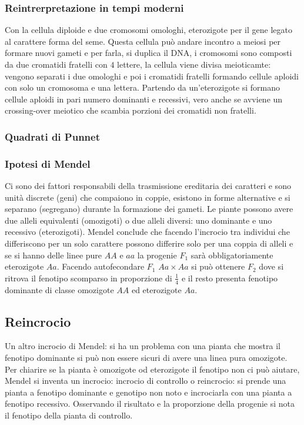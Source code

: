 \subsubsection{Reintrerpretazione in tempi moderni}
Con la cellula diploide e due cromosomi omologhi, eterozigote per il gene legato al carattere forma del seme. Questa cellula pu\`o andare incontro a meiosi per formare nuovi gameti e 
per farla, si duplica il DNA, i cromosomi sono composti da due cromatidi fratelli con $4$ lettere, la cellula viene divisa meioticamte: vengono separati i due omologhi e poi i cromatidi
fratelli formando cellule aploidi con solo un cromosoma e una lettera. Partendo da un'eterozigote si formano cellule aploidi in pari numero dominanti e recessivi, vero anche se avviene
un crossing-over meiotico che scambia porzioni dei cromatidi non fratelli. 
\subsubsection{Quadrati di Punnet}
\subsubsection{Ipotesi di Mendel}
Ci sono dei fattori responsabili della trasmissione ereditaria dei caratteri e sono unit\`a discrete (geni) che compaiono in coppie, esistono in forme alternative e si separano 
(segregano) durante la formazione dei gameti. Le piante possono avere due alleli equivalenti (omozigoti) o due alleli diversi: uno dominante e uno recessivo (eterozigoti). Mendel 
conclude che facendo l'incrocio tra individui che differiscono per un solo carattere possono differire solo per una coppia di alleli e se si hanno delle linee pure $AA$ e $aa$ la 
progenie $F_1$ sar\`a obbligatoriamente eterozigote $Aa$. Facendo autofecondare $F_1$ $Aa\times Aa$ si pu\`o ottenere $F_2$ dove si ritrova il fenotipo scomparso in proporzione di 
$\frac{1}{4}$ e il resto presenta fenotipo dominante di classe omozigote $AA$ ed eterozigote $Aa$. 
\subsection{Reincrocio}
Un altro incrocio di Mendel: si ha un problema con una pianta che mostra il fenotipo dominante si pu\`o non essere sicuri di avere una linea pura omozigote. Per chiarire se la pianta
\`e omozigote od eterozigote il fenotipo non ci pu\`o aiutare, Mendel si inventa un incrocio: incrocio di controllo o reincrocio: si prende una pianta a fenotipo dominante e genotipo 
non noto e incrociarla con una pianta a fenotipo recessivo. Osservando il risultato e la proporzione della progenie si nota il fenotipo della pianta di controllo. 
